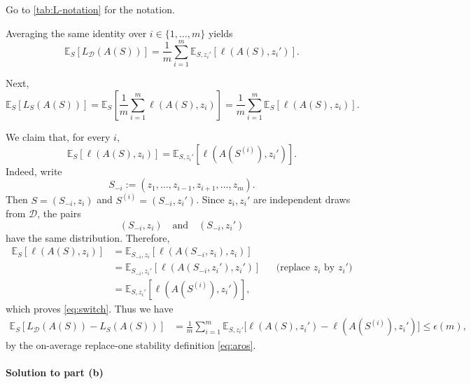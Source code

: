 \documentclass[11pt,a4paper]{article}
\theoremstyle{definition}
\begin{document}
Go to \cref{tab:L-notation} for the notation.

Averaging the same identity over $i \in \{1, \dots, m\}$ yields
\begin{equation}
\mathbb{E}_S[L_{\mathcal{D}}(A(S))] = \frac{1}{m} \sum_{i=1}^m \mathbb{E}_{S, z_i'}[\ell(A(S), z_i')].
\label{eq:expected-pop-avg}
\end{equation}

Next,
\begin{equation}
\mathbb{E}_S[L_S(A(S))] = \mathbb{E}_S\left[\frac{1}{m} \sum_{i=1}^m \ell(A(S), z_i)\right] = \frac{1}{m} \sum_{i=1}^m \mathbb{E}_S[\ell(A(S), z_i)].
\label{eq:expected-empirical}
\end{equation}

We claim that, for every $i$,
\begin{equation}\label{eq:switch}
\mathbb{E}_S[\ell(A(S), z_i)] = \mathbb{E}_{S, z_i'}[\ell(A(S^{(i)}), z_i')].
\end{equation}
Indeed, write
\[
S_{-i} := (z_1, \dots, z_{i-1}, z_{i+1}, \dots, z_m).
\]
Then $S = (S_{-i}, z_i)$ and $S^{(i)} = (S_{-i}, z_i')$. Since $z_i, z_i'$ are independent draws from $\mathcal{D}$, the pairs
\[
(S_{-i}, z_i) \quad \text{and} \quad (S_{-i}, z_i')
\]
have the same distribution. Therefore,
\begin{align*}
\mathbb{E}_S[\ell(A(S), z_i)] &= \mathbb{E}_{S_{-i}, z_i} [\ell(A(S_{-i}, z_i), z_i)] \\
&= \mathbb{E}_{S_{-i}, z_i'} [\ell(A(S_{-i}, z_i'), z_i')]
  && \text{(replace $z_i$ by $z_i'$)} \\
&= \mathbb{E}_{S, z_i'}[\ell(A(S^{(i)}), z_i')],
\end{align*}
which proves \eqref{eq:switch}. Thus we have
\begin{align*}
\mathbb{E}_{S} [L_{\mathcal{D}}(A(S)) - L_{S}(A(S))]
&= \frac{1}{m} \sum_{i=1}^{m} \mathbb{E}_{S, z_i'} \bigl[\ell(A(S), z_i') - \ell(A(S^{(i)}), z_i')\bigr]
\leq \epsilon(m),
\end{align*}
by the on-average replace-one stability definition \eqref{eq:aros}.


\paragraph{Solution to part (b)}
\end{document}
